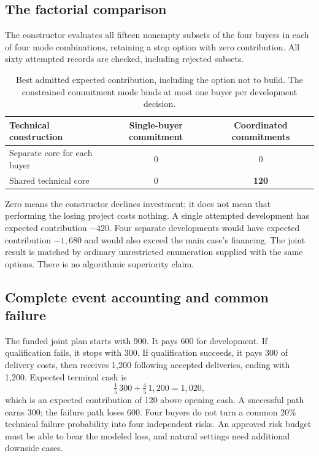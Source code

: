 \documentclass[11pt,letterpaper]{article}
\theoremstyle{remark}\newtheorem{remark}{Remark}[section]
\begin{document}
\subsection{The factorial comparison}
The constructor evaluates all fifteen nonempty subsets of the four buyers in each of four mode combinations, retaining a stop option with zero contribution. All sixty attempted records are checked, including rejected subsets.

\begin{table}[htbp]\centering\small
\caption{Best admitted expected contribution, including the option not to build. The constrained commitment mode binds at most one buyer per development decision.}\label{tab:factorial}
\begin{tabular}{@{}lcc@{}}\toprule
Technical construction & Single-buyer commitment & Coordinated commitments\\\midrule
Separate core for each buyer & 0 & 0\\
Shared technical core & 0 & \textbf{120}\\\bottomrule
\end{tabular}
\end{table}

Zero means the constructor declines investment; it does not mean that performing the losing project costs nothing. A single attempted development has expected contribution $-420$. Four separate developments would have expected contribution $-1{,}680$ and would also exceed the main case's financing. The joint result is matched by ordinary unrestricted enumeration supplied with the same options. There is no algorithmic superiority claim.

\subsection{Complete event accounting and common failure}
The funded joint plan starts with 900. It pays 600 for development. If qualification fails, it stops with 300. If qualification succeeds, it pays 300 of delivery costs, then receives 1,200 following accepted deliveries, ending with 1,200. Expected terminal cash is
\begin{equation}
\tfrac15\,300+\tfrac45\,1{,}200=1{,}020,
\end{equation}
which is an expected contribution of 120 above opening cash. A successful path earns 300; the failure path loses 600. Four buyers do not turn a common 20\% technical failure probability into four independent risks. An approved risk budget must be able to bear the modeled loss, and natural settings need additional downside cases.
\end{document}
